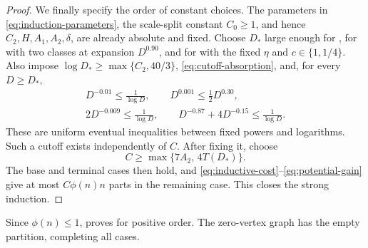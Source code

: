 \begin{proof}
We finally specify the order of constant choices. The parameters
in \eqref{eq:induction-parameters}, the scale-split constant
\(C_0\ge1\), and hence \(C_2,H,A_1,A_2,\delta\), are
already absolute and fixed. Choose \(D_*\) large enough for
, for
 with two classes at expansion
\(D^{0.90}\), and for  with the
fixed \(\eta\) and \(c\in\{1,1/4\}\). Also impose
\(\log D_*\ge\max\{C_2,40/3\}\),
\eqref{eq:cutoff-absorption}, and, for every \(D\ge D_*\),
\[
 \begin{gathered}
 D^{-0.01}\le\frac1{\log D},\qquad
 D^{0.001}\le\tfrac12D^{0.30},\\
 2D^{-0.009}\le\frac1{\log D},\qquad
 D^{-0.87}+4D^{-0.15}\le\frac1{\log D}.
 \end{gathered}
\]
These are uniform eventual inequalities between fixed powers
and logarithms. Such a cutoff exists independently of \(C\).
After fixing it, choose
\[
 C\ge\max\{7A_2,\,4T(D_*)\}.
\]
The base and terminal cases then hold, and
\eqref{eq:inductive-cost}--\eqref{eq:potential-gain} give at
most \(C\phi(n)n\) parts in the remaining case. This closes
the strong induction.
\end{proof}

Since \(\phi(n)\le1\),  proves
 for positive order. The zero-vertex graph has
the empty partition, completing all cases.
